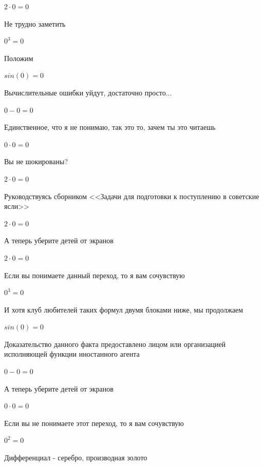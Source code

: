 \documentclass[12pt,a4paper,fleqn]{article}
\begin{document}
\begin{center}$2 \cdot 0 = 0$\end{center}
Не трудно заметить

\begin{center}$0^{3} = 0$\end{center}
Положим

\begin{center}$sin(0) = 0$\end{center}
Вычислительные ошибки уйдут, достаточно просто...

\begin{center}$0-0 = 0$\end{center}
Единственное, что я не понимаю, так это то, зачем ты это читаешь

\begin{center}$0 \cdot 0 = 0$\end{center}
Вы не шокированы?\cite{link3}

\begin{center}$2 \cdot 0 = 0$\end{center}
Руководствуясь сборником <<Задачи для подготовки к поступлению в советские ясли>>\cite{link1}

\begin{center}$2 \cdot 0 = 0$\end{center}
А теперь уберите детей от экранов

\begin{center}$2 \cdot 0 = 0$\end{center}
Если вы понимаете данный переход, то я вам сочувствую

\begin{center}$0^{3} = 0$\end{center}
И хотя клуб любителей таких формул двумя блоками ниже, мы продолжаем

\begin{center}$sin(0) = 0$\end{center}
Доказательство данного факта предоставлено лицом или организацией исполняющей функции иностанного агента

\begin{center}$0-0 = 0$\end{center}
А теперь уберите детей от экранов

\begin{center}$0 \cdot 0 = 0$\end{center}
Если вы не понимаете этот переход, то я вам сочувствую

\begin{center}$0^{2} = 0$\end{center}
Дифференциал - серебро, производная золото\cite{link2}
\end{document}
